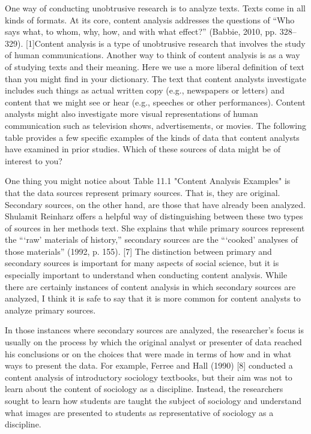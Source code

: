 One way of conducting unobtrusive research is to analyze texts. Texts come in all kinds of formats. At its core, content analysis addresses the questions of “Who says what, to whom, why, how, and with what effect?” (Babbie, 2010, pp. 328–329). [1]Content analysis is a type of unobtrusive research that involves the study of human communications. Another way to think of content analysis is as a way of studying texts and their meaning. Here we use a more liberal definition of text than you might find in your dictionary. The text that content analysts investigate includes such things as actual written copy (e.g., newspapers or letters) and content that we might see or hear (e.g., speeches or other performances). Content analysts might also investigate more visual representations of human communication such as television shows, advertisements, or movies. The following table provides a few specific examples of the kinds of data that content analysts have examined in prior studies. Which of these sources of data might be of interest to you?

One thing you might notice about Table 11.1 "Content Analysis Examples" is that the data sources represent primary sources. That is, they are original. Secondary sources, on the other hand, are those that have already been analyzed. Shulamit Reinharz offers a helpful way of distinguishing between these two types of sources in her methods text. She explains that while primary sources represent the “‘raw’ materials of history,” secondary sources are the “‘cooked’ analyses of those materials” (1992, p. 155). [7] The distinction between primary and secondary sources is important for many aspects of social science, but it is especially important to understand when conducting content analysis. While there are certainly instances of content analysis in which secondary sources are analyzed, I think it is safe to say that it is more common for content analysts to analyze primary sources.

In those instances where secondary sources are analyzed, the researcher’s focus is usually on the process by which the original analyst or presenter of data reached his conclusions or on the choices that were made in terms of how and in what ways to present the data. For example, Ferree and Hall (1990) [8] conducted a content analysis of introductory sociology textbooks, but their aim was not to learn about the content of sociology as a discipline. Instead, the researchers sought to learn how students are taught the subject of sociology and understand what images are presented to students as representative of sociology as a discipline.

